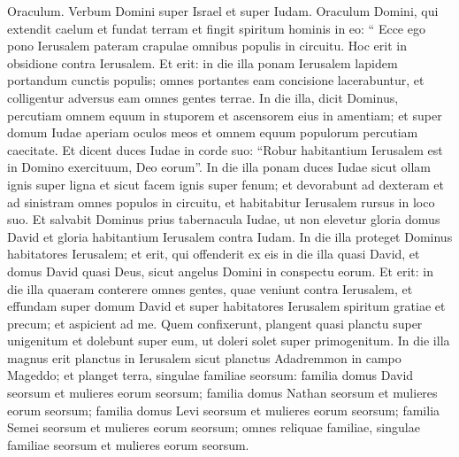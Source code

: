 \begin{biblechapter}
\begin{biblechapter}
\begin{biblechapter}
\begin{biblechapter}
\begin{biblechapter}
\begin{biblechapter}
\begin{biblechapter}
\begin{biblechapter}
\begin{biblechapter}
\begin{biblechapter}
\begin{biblechapter}
\begin{biblechapter}
\verse Oraculum. Verbum Domini super Israel et super Iudam. Oraculum Domini, qui extendit caelum et fundat terram et fingit spiritum hominis in eo: 
\verse “ Ecce ego pono Ierusalem pateram crapulae omnibus populis in circuitu. Hoc erit in obsidione contra Ierusalem. 
\verse Et erit: in die illa ponam Ierusalem lapidem portandum cunctis populis; omnes portantes eam concisione lacerabuntur, et colligentur adversus eam omnes gentes terrae. 
\verse In die illa, dicit Dominus, percutiam omnem equum in stuporem et ascensorem eius in amentiam; et super domum Iudae aperiam oculos meos et omnem equum populorum percutiam caecitate. 
\verse Et dicent duces Iudae in corde suo: “Robur habitantium Ierusalem est in Domino exercituum, Deo eorum”. 
\verse In die illa ponam duces Iudae sicut ollam ignis super ligna et sicut facem ignis super fenum; et devorabunt ad dexteram et ad sinistram omnes populos in circuitu, et habitabitur Ierusalem rursus in loco suo. 
\verse Et salvabit Dominus prius tabernacula Iudae, ut non elevetur gloria domus David et gloria habitantium Ierusalem contra Iudam. 
\verse In die illa proteget Dominus habitatores Ierusalem; et erit, qui offenderit ex eis in die illa quasi David, et domus David quasi Deus, sicut angelus Domini in conspectu eorum.
 \verse Et erit: in die illa quaeram conterere omnes gentes, quae veniunt contra Ierusalem, 
\verse et effundam super domum David et super habitatores Ierusalem spiritum gratiae et precum; et aspicient ad me. Quem confixerunt, plangent quasi planctu super unigenitum et dolebunt super eum, ut doleri solet super primogenitum. 
\verse In die illa magnus erit planctus in Ierusalem sicut planctus Adadremmon in campo Mageddo; 
\verse et planget terra, singulae familiae seorsum:
 familia domus David seorsum
 et mulieres eorum seorsum;
 familia domus Nathan seorsum
 et mulieres eorum seorsum;
 \verse familia domus Levi seorsum
 et mulieres eorum seorsum;
 familia Semei seorsum
 et mulieres eorum seorsum;
 \verse omnes reliquae familiae, singulae familiae seorsum
 et mulieres eorum seorsum.
 

\end{biblechapter}
\end{biblechapter}
\end{biblechapter}
\end{biblechapter}
\end{biblechapter}
\end{biblechapter}
\end{biblechapter}
\end{biblechapter}
\end{biblechapter}
\end{biblechapter}
\end{biblechapter}
\end{biblechapter}
